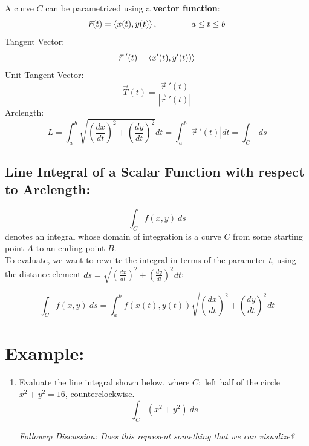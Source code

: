 \hspace*{.4in}

A curve  \(C\) can be parametrized using a \textbf{vector function}:
\[
\vec{r}(t) = \left\langle x(t), y(t)\right\rangle, \qquad \qquad a\leq t \leq b
\]
Tangent Vector:
\[
\vec{r}\ '(t) = \left\langle x'(t), y'(t))\right\rangle
\]
Unit Tangent Vector:
\[
\vec{T}(t) = \frac{\vec{r}\ '(t)}{|\vec{r}\ '(t)|} 
\]
Arclength:
\[
L =\int_a^b \sqrt{\left(\frac{dx}{dt}\right)^2+\left(\frac{dy}{dt}\right)^2} dt = \int_a^b |\vec{r}\ '(t)| dt = \int_C \ ds
\]


\vspace*{.1in}%

\subsection*{Line Integral of a Scalar Function with respect to Arclength:}

\[
\int_C f(x,y)\ ds
\]
denotes an integral whose domain of integration is a curve \(C\) from some starting point \(A\) to an ending point \(B\).\\
  To evaluate, we want to rewrite the integral in terms of the parameter \(t\), using the distance element \(ds = \sqrt{\left(\frac{dx}{dt}\right)^2+\left(\frac{dy}{dt}\right)^2} dt \):

\[
\int_C f(x,y)\ ds = \int_a^b f( x(t), y(t) ) \sqrt{\left(\frac{dx}{dt}\right)^2+\left(\frac{dy}{dt}\right)^2} dt 
\]






\section*{Example:}


\begin{enumerate}[{Example} 1: ]
\item Evaluate the line integral shown below, where \(C:\) left half of the circle \(x^2+y^2=16\), counterclockwise.
\[\int_C (x^2+y^2) \ ds\]

\vfill

\textit{Followup Discussion: Does this represent something that we can visualize?}


\end{enumerate}

